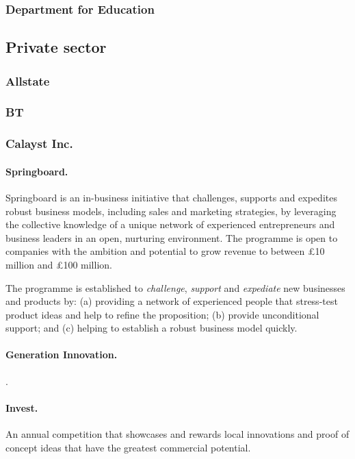 \subsubsection{Department for Education}

\subsection{Private sector}

\subsubsection{Allstate}

\subsubsection{BT}

\subsubsection{Calayst Inc.}

\paragraph{Springboard.} Springboard is an in-business initiative that challenges, supports and expedites robust business models, including sales and marketing strategies, by leveraging the collective knowledge of a unique network of experienced entrepreneurs and business leaders in an open, nurturing environment. The programme is open to companies with the ambition and potential to grow revenue to between \pounds 10 million and \pounds 100 million.

The programme is established to \emph{challenge}, \emph{support} and \emph{expediate} new businesses and products by: (a) providing a network of experienced people that stress-test product ideas and help to refine the proposition; (b) provide unconditional support; and (c) helping to establish a robust business model quickly.

\paragraph{Generation Innovation.} .

\paragraph{Invest.} An annual competition that showcases and rewards local innovations and proof of concept ideas that have the greatest commercial potential.

